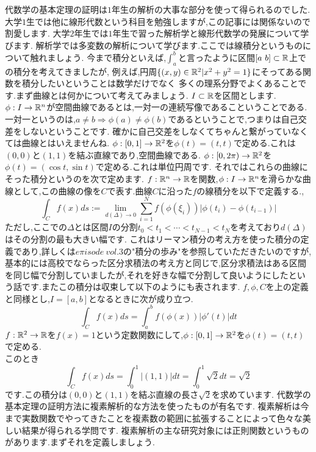 代数学の基本定理の証明は$1$年生の解析の大事な部分を使って得られるのでした.
大学$1$生では他に線形代数という科目を勉強しますが,この記事には関係ないので割愛します.
大学$2$年生では$1$年生で習った解析学と線形代数学の発展について学びます.
解析学では多変数の解析について学びます.ここでは線積分というものについて触れましょう.
今まで積分といえば,$\int_a^b$と言ったように区間$[a\ b]\subset \mathbb R$上での積分を考えてきましたが,
例えば,円周$\{(x,y)\in\mathbb R^2 | x^2+y^2=1\}$にそってある関数を積分したいということは数学だけでなく
多くの理系分野でよくあることです.まず曲線とは何かについて考えてみましょう.
$I\subset\mathbb R$を区間とします.$\phi:I \to \mathbb R^n$が空間曲線であるとは,一対一の連続写像であるこということである.
一対一というのは,$a\neq b \Rightarrow \phi(a) \neq \phi(b)$であるということで,つまりは自己交差をしないということです.
確かに自己交差をしなくてちゃんと繋がっていなくては曲線とはいえませんね.
\ex
$\phi:[0,1] \to \mathbb R^2$を$\phi(t)=(t,t)$で定める.これは$(0,0)$と$(1,1)$を結ぶ直線であり,空間曲線である.
\exx
\ex
$\phi:[0,2\pi) \to \mathbb R^2$を$\phi(t)=(\cos t ,\sin t)$で定める.これは単位円周です.
\exx
それではこれらの曲線にそった積分というのを次で定めます.
$f:\mathbb R^n \to \mathbb R$を関数,$\phi:I\to\mathbb R^n$を滑らかな曲線として,この曲線の像を$C$で表す.曲線$C$に沿った$f$の線積分を以下で定義する.,
\[
\int_C f(x)ds := \lim_{d(\Delta)\to 0} \sum_{i=1}^N f(\phi(\xi_i)) |\phi(t_i) - \phi(t_{i-1})|
\]
ただし,ここでの$\Delta$とは区間$I$の分割$t_0 < t_1 < \cdots < t_{N-1} < t_N$を考えており$d(\Delta)$はその分割の最も大きい幅です.
これはリーマン積分の考え方を使った積分の定義であり,詳しくは$e\pi isode\ vol.3$の"積分の歩み"を参照していただきたいのですが,
基本的には高校でならった区分求積法の考え方と同じで,区分求積法はある区間を同じ幅で分割していましたが,それを好きな幅で分割して良いようにしたという話です.またこの積分は収束して以下のようにも表されます.
\prop
$f,\phi,C$を上の定義と同様とし,$I=[a,b]$となるときに次が成り立つ.
\[
\int_C f(x) ds = \int_a^b f(\phi(x))|\phi'(t)|dt
\]
\propx
\ex
$f:\mathbb R^2\to\mathbb R$を$f(x)=1$という定数関数にして,$\phi:[0,1] \to \mathbb R^2$を$\phi(t)=(t,t)$で定める.\\
このとき
\[
\int_C f(x) ds = \int_0^1 |(1,1)| dt = \int_0^1 \sqrt{2}  dt  = \sqrt{2}
\]
です.この積分は$(0,0)$と$(1,1)$を結ぶ直線の長さ$\sqrt{2}$を求めています.
\exx
{}
代数学の基本定理の証明方法に複素解析的な方法を使ったものが有名です.
複素解析は今まで実数関数でやってきたことを複素数の範囲に拡張することによって色々な美しい結果が得られる学問です.
複素解析の主な研究対象には正則関数というものがあります.まずそれを定義しましょう.
